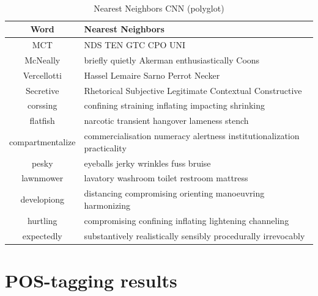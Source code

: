         \begin{table}[!hp]
          \begin{center}
            \caption{Nearest Neighbors CNN (polyglot)}
            ~\\
            \small
            \label{tab:nearest:cnn-polyglot}
            \begin{tabular}{c|l}
              \textbf{Word} & \textbf{Nearest Neighbors}\\
              \hline
              MCT & \multicolumn{1}{p{0.7\textwidth}}{NDS TEN GTC CPO UNI}\\
              McNeally & \multicolumn{1}{p{0.7\textwidth}}{briefly quietly Akerman enthusiastically Coons}\\
              Vercellotti & \multicolumn{1}{p{0.7\textwidth}}{Hassel Lemaire Sarno Perrot Necker}\\
              Secretive & \multicolumn{1}{p{0.7\textwidth}}{Rhetorical Subjective Legitimate Contextual Constructive}\\
              corssing & \multicolumn{1}{p{0.7\textwidth}}{confining straining inflating impacting shrinking}\\
              flatfish & \multicolumn{1}{p{0.7\textwidth}}{narcotic transient hangover lameness stench}\\
              compartmentalize & \multicolumn{1}{p{0.7\textwidth}}{commercialisation numeracy alertness institutionalization practicality}\\
              pesky & \multicolumn{1}{p{0.7\textwidth}}{eyeballs jerky wrinkles fuss bruise}\\
              lawnmower & \multicolumn{1}{p{0.7\textwidth}}{lavatory washroom toilet restroom mattress}\\
              developiong & \multicolumn{1}{p{0.7\textwidth}}{distancing compromising orienting manoeuvring harmonizing}\\
              hurtling & \multicolumn{1}{p{0.7\textwidth}}{compromising confining inflating lightening channeling}\\
              expectedly & \multicolumn{1}{p{0.7\textwidth}}{substantively realistically sensibly procedurally irrevocably}\\
            \end{tabular}
          \end{center}
        \end{table}

    \pagebreak[4]
    \section{POS-tagging results}
      
